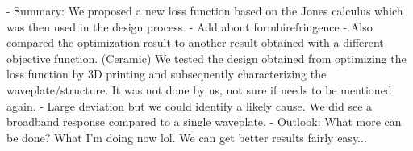 - Summary: We proposed a new loss function based on the Jones calculus which was then used in the design process. 
\newline
    - Add about formbirefringence
    \newline
    - Also compared the optimization result to another result obtained with a different objective function. (Ceramic)
\newline
We tested the design obtained from optimizing the loss function by 3D printing and subsequently characterizing the waveplate/structure. It was not done by us, not sure if needs to be mentioned again. 
\newline
- Large deviation but we could identify a likely cause. We did see a broadband response compared to a single waveplate.
\newline
- Outlook: What more can be done? What I'm doing now lol. We can get better results fairly easy...
